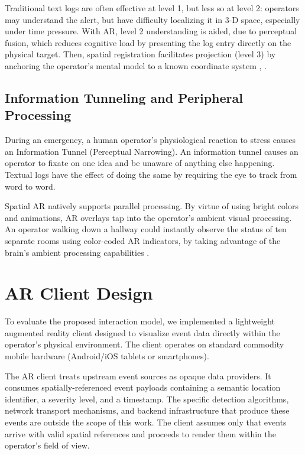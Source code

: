\documentclass[conference]{IEEEtran}
\begin{document}
Traditional text logs are often effective at level 1, but less so at level 2: operators may understand the alert, but have difficulty localizing it in 3-D space, especially under time pressure. With AR, level 2 understanding is aided, due to perceptual fusion, which reduces cognitive load by presenting the log entry directly on the physical target. Then, spatial registration facilitates projection (level 3) by anchoring the operator’s mental model to a known coordinate system \cite{b5}, \cite{b28}.

\subsection{Information Tunneling and Peripheral Processing}
During an emergency, a human operator's physiological reaction to stress causes an Information Tunnel (Perceptual Narrowing). An information tunnel causes an operator to fixate on one idea and be unaware of anything else happening. Textual logs have the effect of doing the same by requiring the eye to track from word to word.

Spatial AR natively supports parallel processing. By virtue of using bright colors and animations, AR overlays tap into the operator’s ambient visual processing. An operator walking down a hallway could instantly observe the status of ten separate rooms using color-coded AR indicators, by taking advantage of the brain’s ambient processing capabilities \cite{b18}.

\section{AR Client Design}

To evaluate the proposed interaction model, we implemented a lightweight augmented reality client designed to visualize event data directly within the operator's physical environment. The client operates on standard commodity mobile hardware (Android/iOS tablets or smartphones).

The AR client treats upstream event sources as opaque data providers. It consumes spatially-referenced event payloads containing a semantic location identifier, a severity level, and a timestamp. The specific detection algorithms, network transport mechanisms, and backend infrastructure that produce these events are outside the scope of this work. The client assumes only that events arrive with valid spatial references and proceeds to render them within the operator's field of view.
\end{document}
